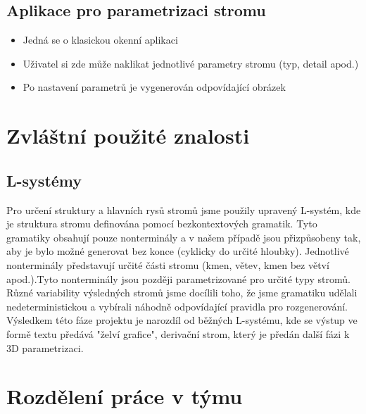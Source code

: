 \documentclass[11pt,a4paper]{article}
\begin{document}
\subsection{Aplikace pro parametrizaci stromu}
\begin{itemize}
\item Jedná se o klasickou okenní aplikaci
\item Uživatel si zde může naklikat jednotlivé parametry stromu (typ, detail apod.)
\item Po nastavení parametrů je vygenerován odpovídající obrázek
\end{itemize}
\section{Zvláštní použité znalosti}

%

\subsection{L-systémy}
Pro určení struktury a hlavních rysů stromů jsme použily upravený L-systém,
kde je struktura stromu definována pomocí bezkontextových gramatik. Tyto gramatiky 
obsahují pouze nonterminály a v našem případě jsou přizpůsobeny tak, aby je bylo možné
generovat bez konce (cyklicky do určité hloubky). Jednotlivé nonterminály představují 
určité části stromu (kmen, větev, kmen bez větví apod.).Tyto nonterminály jsou později
parametrizované pro určité typy stromů. Různé variability výsledných stromů jsme
docílili toho, že jsme gramatiku udělali nedeterministickou a vybírali náhodně
odpovídající pravidla pro rozgenerování. Výsledkem této fáze projektu je narozdíl 
od běžných L-systému, kde se výstup ve formě textu předává "želví grafice", 
derivační strom, který je předán další fázi k 3D parametrizaci.

\section{Rozdělení práce v týmu}

%
\end{document}
